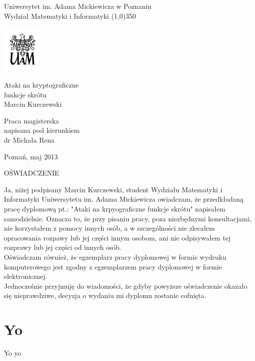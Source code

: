 \documentclass[a4paper,twoside]{article}
\begin{document}
\pagestyle{headings}

\begin{titlepage}
	\begin{center}
	{\LARGE Uniwersytet im. Adama Mickiewicza w Poznaniu \\
	Wydział Matematyki i Informatyki }
	\line(1,0){350}

	\vspace{1cm}
	\includegraphics[width=2cm]{logo-uam/logo-uam.png}
	\vspace{1cm}

	\vspace{1cm}
	{\Huge Ataki na kryptograficzne \\ funkcje skrótu} \\[0.5cm]
	{\Large Marcin Kurczewski}
	\end{center}

	\vspace{3cm}
	\hspace{8cm}\parbox[l]{6cm}{\Large Praca magisterska \\
	napisana pod kierunkiem \\
	dr Michała Rena}

	\begin{center}
	\vspace{4cm}
	Poznań, maj 2013
	\end{center}

\end{titlepage}


\newpage
\thispagestyle{empty}
\begin{center}
	OŚWIADCZENIE
\end{center}

	Ja, niżej podpisany Marcin Kurczewski, student Wydziału Matematyki i
Informatyki Uniwersytetu im. Adama Mickiewicza owiadczam, że przedkładaną pracę
dyplomową pt.: "Ataki na krpyograficzne funkcje skrótu" napisałem samodzielnie.
Oznacza to, że przy pisaniu pracy, poza niezbędnymi konsultacjami, nie
korzystałem z pomocy innych osób, a w szczególności nie zlecałem opracowania
rozpawy lub jej części innym osobom, ani nie odpisywałem tej rozprawy lub jej
części od innych osób. \\
	Oświadczam również, że egzemplarz pracy dyplomowej w formie wydruku
komputerowego jest zgodny z egzemplarzem pracy dyplomowej w formie
elektronicznej. \\
	Jednocześnie przyjmuję do wiadomości, że gdyby powyższe oświadczenie okazało
się nieprawdziwe, decyzja o wydaniu mi dyplomu zostanie cofnięta.


\newpage


\section {Yo}
Yo yo
\end{document}
